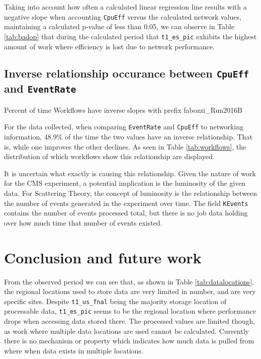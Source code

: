 \documentclass[sigconf]{acmart}
\begin{document}
Taking into account how often a calculated linear regression line results with a negative slope when accounting \texttt{CpuEff} versus the calculated network values, maintaining a calculated p-value of less than 0.05, we can observe in Table \ref{tab:badop} that during the calculated period that \texttt{t1\_es\_pic} exhibits the highest amount of work where efficiency is lost due to network performance. 
\subsection{Inverse relationship occurance between \texttt{CpuEff} and \texttt{EventRate}}
\begin{table}
	\caption{Percent of time Workflows have inverse slopes with prefix fabozzi\_Run2016B}
	\label{tab:workflows}
\end{table}

For the data collected, when comparing \texttt{EventRate} and \texttt{CpuEff} to networking information, 48.9\% of the time the two values have an inverse relationship. That is, while one improves the other declines. As seen in Table \ref{tab:workflows}, the distribution of which workflows show this relationship are displayed. 

It is uncertain what exactly is causing this relationship. Given the nature of work for the CMS experiment, a potential implication is the luminosity of the given data. For Scattering Theory, the concept of luminosity\cite{lumi} is the relationship between the number of events generated in the experiment over time. The field \texttt{KEvents} contains the number of events processed total, but there is no job data holding over how much time that number of events existed.
\section{Conclusion and future work}
From the observed period we can see that, as shown in Table \ref{tab:datalocations}, the regional locations used to store data are very limited in number, and are very specific sites. Despite \texttt{t1\_us\_fnal} being the majority storage location of processable data, \texttt{t1\_es\_pic} seems to be the regional location where performance drops when accessing data stored there. The processed values are limited though, as work where multiple data locations are used cannot be calculated. Currently there is no mechanism or property which indicates how much data is pulled from where when data exists in multiple locations.
\end{document}
